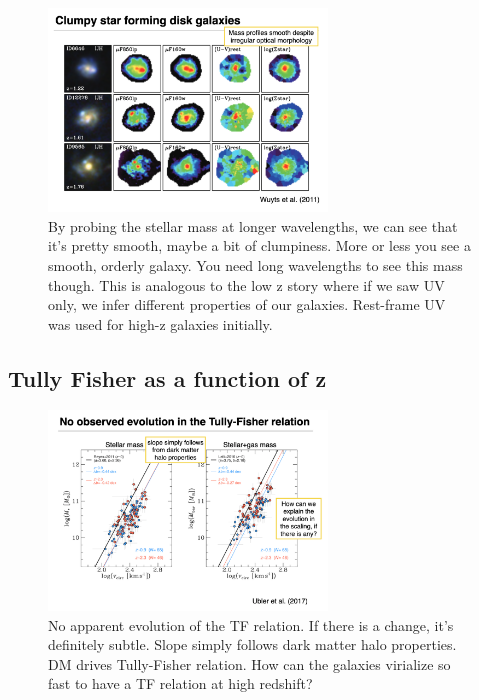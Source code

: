 \documentclass{article}
\begin{document}
\begin{figure}
    \centering
\includegraphics[width=0.66\textwidth]{figs/Screen Shot 2021-10-27 at 10.50.00 AM.png}
    \caption{By probing the stellar mass at longer wavelengths, we can see that it's pretty smooth, maybe a bit of clumpiness. More or less you see a smooth, orderly galaxy. You need long wavelengths to see this mass though. This is analogous to the low z story where if we saw UV only, we infer different properties of our galaxies. Rest-frame UV was used for high-z galaxies initially. }
    \label{fig:mass_clumps}
\end{figure}

\subsection{Tully Fisher as a function of z}

\begin{figure}
    \centering
    \includegraphics[width=0.66\textwidth]{figs/Screen Shot 2021-10-27 at 10.52.32 AM.png}
    \caption{No apparent evolution of the TF relation. If there is a change, it's definitely subtle. Slope simply follows dark matter halo properties. DM drives Tully-Fisher relation. How can the galaxies virialize so fast to have a TF relation at high redshift?}
    \label{fig:aaaaaaa}
\end{figure}
\end{document}
